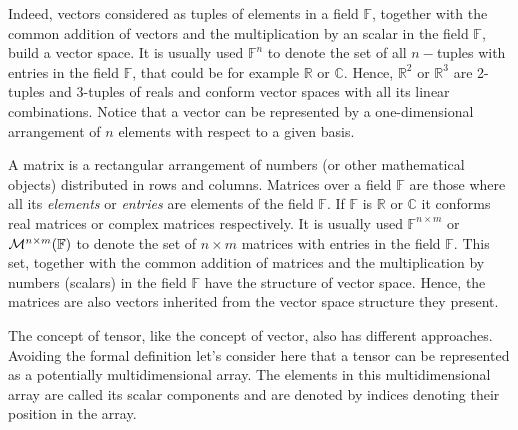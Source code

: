 Indeed, vectors considered as tuples of elements in a field $\mathbb{F}$, together with the common addition of vectors and the multiplication by an scalar in the field $\mathbb{F}$, build a vector space. 
It is usually used $\mathbb{F}^{n}$ to denote the set of all $n-$tuples with entries in the field $\mathbb{F}$, that could be for example $\mathbb{R}$ or $\mathbb{C}$. 
Hence, $\mathbb{R}^{2}$ or $\mathbb{R}^{3}$ are 2-tuples and 3-tuples of reals and conform vector spaces with all its linear combinations.
Notice that a vector can be represented by a one-dimensional arrangement of $n$ elements with respect to a given basis.

A matrix is a rectangular arrangement of numbers (or other mathematical objects) distributed in rows and columns.
Matrices over a field $\mathbb{F}$ are those where all its \textit{elements} or \textit{entries} are elements of the field $\mathbb{F}$.
If $\mathbb{F}$ is $\mathbb{R}$ or $\mathbb{C}$ it conforms real matrices or complex matrices respectively.
It is usually used $\mathbb{F}^{n\times m}$ or  ${ \cal{M}}^{n \times m} (\mathbb{F})$ to denote the set of $n\times m$ matrices with entries in the field $\mathbb{F}$. 
This set, together with the common addition of matrices and the multiplication by numbers (scalars) in the field $\mathbb{F}$ have the structure of vector space. 
Hence, the matrices are also vectors inherited from the vector space structure they present.

The concept of tensor, like the concept of vector, also has different approaches. 
Avoiding the formal definition let's consider here that a tensor can be represented as a potentially multidimensional array.
The elements in this multidimensional array are called its scalar components and are denoted by indices denoting their position in the array.

